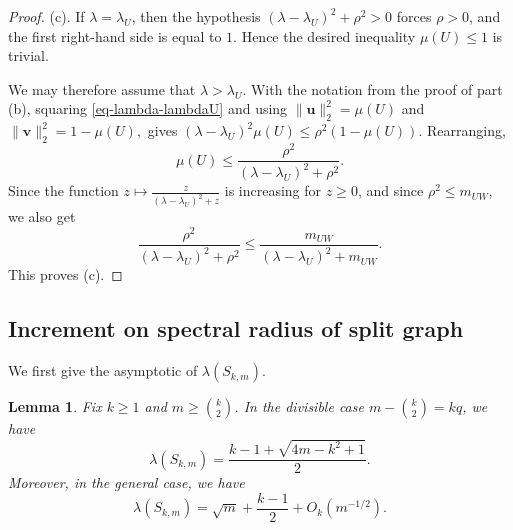 \documentclass[11pt]{article}
\newtheorem{lemma}[theorem]{Lemma}
\theoremstyle{definition}
\theoremstyle{plain}
\begin{document}
\begin{proof}
\smallskip
\noindent\textup{(c).}
If \(\lambda=\lambda_U\), then the hypothesis
\((\lambda-\lambda_U)^2+\rho^2>0\) forces \(\rho>0\), and the first
right-hand side is equal to \(1\).  Hence the desired inequality
\(\mu(U)\le 1\) is trivial.

We may therefore assume that \(\lambda>\lambda_U\).  With the notation
from the proof of part \textup{(b)}, squaring \eqref{eq-lambda-lambdaU}
and using $\|\bm{u}\|_2^2=\mu(U)$ and  $\|\bm{v}\|_2^2=1-\mu(U),$
gives $(\lambda-\lambda_U)^2\mu(U)
        \le
        \rho^2(1-\mu(U)).$ Rearranging,
\[
        \mu(U)
        \le
        \frac{\rho^2}{(\lambda-\lambda_U)^2+\rho^2}.
\]
Since the function $z\mapsto \frac{z}{(\lambda-\lambda_U)^2+z}$ is increasing for \(z\ge 0\), and since \(\rho^2\le m_{UW}\), we also get
\[
        \frac{\rho^2}{(\lambda-\lambda_U)^2+\rho^2}
        \le
        \frac{m_{UW}}{(\lambda-\lambda_U)^2+m_{UW}}.
\]
This proves (c).
\end{proof}


\subsection{Increment on spectral radius of split graph}

We first give the asymptotic of $\lambda(S_{k,m})$.

\begin{lemma}\label{lem:Skm-asymptotic-lambda}
Fix $k\ge 1$ and $m\ge \binom{k}{2}$. In the divisible case $m-\binom{k}{2}=kq$, we have
\begin{equation}\label{eq:Skm-lambda-divisible}
  \lambda(S_{k,m})
  =
  \frac{k-1+\sqrt{4m-k^2+1}}{2}.
\end{equation} 
Moreover, in the general case, we have
\begin{equation}\label{eq:Skm-lambda-asymptotic}
  \lambda(S_{k,m}) = \sqrt m+\frac{k-1}{2}+O_k(m^{-1/2}).
\end{equation}
\end{lemma}
\end{document}
